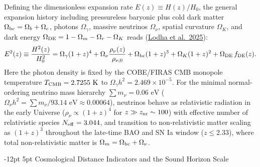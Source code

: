 \documentclass[11pt,letterpaper]{article}
\makeatletter
\renewcommand{\subsection}{\@startsection{subsection}{2}{\z@}%
  {-12pt \@plus -3pt \@minus -1pt}%
  {5pt \@plus 1pt}%
  {\normalfont\large\bfseries\color{tealaccent}}}
\makeatother
\begin{document}
Defining the dimensionless expansion rate $E(z) \equiv H(z)/H_0$, the general expansion history including pressureless baryonic plus cold dark matter $\Omega_{\rm bc} = \Omega_b + \Omega_c$, photons $\Omega_\gamma$, massive neutrinos $\Omega_\nu$, spatial curvature $\Omega_K$, and dark energy $\Omega_{\rm DE} = 1 - \Omega_m - \Omega_r - \Omega_K$ reads (\href{https://arxiv.org/abs/2503.14743}{Lodha et al.\ 2025}):
\begin{equation}
    E^2(z) \equiv \frac{H^2(z)}{H_0^2} = \Omega_\gamma (1+z)^4 + \Omega_\nu \frac{\rho_\nu(z)}{\rho_{\nu,0}} + \Omega_{\rm bc}(1+z)^3 + \Omega_K(1+z)^2 + \Omega_{\rm DE}\, f_{\rm DE}(z).
    \label{eq:Ez_full}
\end{equation}
Here the photon density is fixed by the COBE/FIRAS CMB monopole temperature $T_{\rm CMB} = 2.7255\text{ K}$ to $\Omega_\gamma h^2 = 2.469 \times 10^{-5}$. For the minimal normal-ordering neutrino mass hierarchy $\sum m_\nu = 0.06\text{ eV}$ ($\Omega_\nu h^2 = \sum m_\nu / 93.14\text{ eV} \approx 0.00064$), neutrinos behave as relativistic radiation in the early Universe ($\rho_\nu \propto (1+z)^4$ for $z \gg z_{\rm nr} \sim 100$) with effective number of relativistic species $N_{\rm eff} = 3.044$, and transition to non-relativistic matter scaling as $(1+z)^3$ throughout the late-time BAO and SN Ia window ($z \le 2.33$), where total non-relativistic matter is $\Omega_m = \Omega_{\rm bc} + \Omega_\nu$.

\subsection{Cosmological Distance Indicators and the Sound Horizon Scale}
\end{document}
